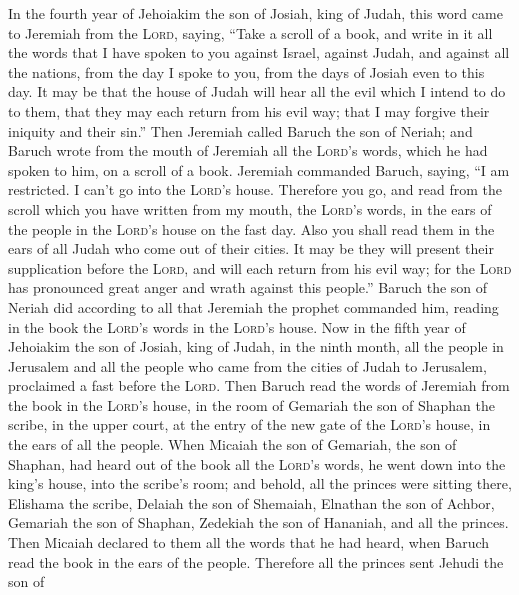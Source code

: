  In the fourth year of Jehoiakim the son of Josiah, king
of Judah, this word came to Jeremiah from the \textsc{Lord}, saying,
 ``Take a scroll of a book, and write in it all the words
that I have spoken to you against Israel, against Judah, and against all
the nations, from the day I spoke to you, from the days of Josiah even
to this day.  It may be that the house of Judah will hear
all the evil which I intend to do to them, that they may each return
from his evil way; that I may forgive their iniquity and their sin.''
 Then Jeremiah called Baruch the son of Neriah; and Baruch
wrote from the mouth of Jeremiah all the \textsc{Lord}'s words, which he
had spoken to him, on a scroll of a book.  Jeremiah
commanded Baruch, saying, ``I am restricted. I can't go into the
\textsc{Lord}'s house.  Therefore you go, and read from
the scroll which you have written from my mouth, the \textsc{Lord}'s
words, in the ears of the people in the \textsc{Lord}'s house on the
fast day. Also you shall read them in the ears of all Judah who come out
of their cities.  It may be they will present their
supplication before the \textsc{Lord}, and will each return from his
evil way; for the \textsc{Lord} has pronounced great anger and wrath
against this people.''  Baruch the son of Neriah did
according to all that Jeremiah the prophet commanded him, reading in the
book the \textsc{Lord}'s words in the \textsc{Lord}'s house.
 Now in the fifth year of Jehoiakim the son of Josiah,
king of Judah, in the ninth month, all the people in Jerusalem and all
the people who came from the cities of Judah to Jerusalem, proclaimed a
fast before the \textsc{Lord}.  Then Baruch read the
words of Jeremiah from the book in the \textsc{Lord}'s house, in the
room of Gemariah the son of Shaphan the scribe, in the upper court, at
the entry of the new gate of the \textsc{Lord}'s house, in the ears of
all the people.  When Micaiah the son of Gemariah, the
son of Shaphan, had heard out of the book all the \textsc{Lord}'s words,
 he went down into the king's house, into the scribe's
room; and behold, all the princes were sitting there, Elishama the
scribe, Delaiah the son of Shemaiah, Elnathan the son of Achbor,
Gemariah the son of Shaphan, Zedekiah the son of Hananiah, and all the
princes.  Then Micaiah declared to them all the words
that he had heard, when Baruch read the book in the ears of the people.
 Therefore all the princes sent Jehudi the son of
